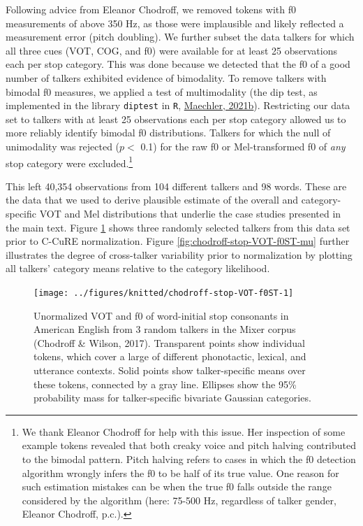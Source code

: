 \documentclass[
  11pt,
  man,floatsintext]{apa6}
\begin{document}
Following advice from Eleanor Chodroff, we removed tokens with f0 measurements of above 350 Hz, as those were implausible and likely reflected a measurement error (pitch doubling). We further subset the data talkers for which all three cues (VOT, COG, and f0) were available for at least 25 observations each per stop category. This was done because we detected that the f0 of a good number of talkers exhibited evidence of bimodality. To remove talkers with bimodal f0 measures, we applied a test of multimodality (the dip test, as implemented in the library \texttt{diptest} in \texttt{R}, \protect\hyperlink{ref-maechler2021}{Maechler, 2021b}). Restricting our data set to talkers with at least 25 observations each per stop category allowed us to more reliably identify bimodal f0 distributions. Talkers for which the null of unimodality was rejected (\(p<\) 0.1) for the raw f0 or Mel-transformed f0 of \emph{any} stop category were excluded.\footnote{We thank Eleanor Chodroff for help with this issue. Her inspection of some example tokens revealed that both creaky voice and pitch halving contributed to the bimodal pattern. Pitch halving refers to cases in which the f0 detection algorithm wrongly infers the f0 to be half of its true value. One reason for such estimation mistakes can be when the true f0 falls outside the range considered by the algorithm (here: 75-500 Hz, regardless of talker gender, Eleanor Chodroff, p.c.).}

This left 40,354 observations from 104 different talkers and 98 words. These are the data that we used to derive plausible estimate of the overall and category-specific VOT and Mel distributions that underlie the case studies presented in the main text. Figure \ref{fig:chodroff-stop-VOT-f0ST} shows three randomly selected talkers from this data set prior to C-CuRE normalization. Figure \ref{fig:chodroff-stop-VOT-f0ST-mu} further illustrates the degree of cross-talker variability prior to normalization by plotting all talkers' category means relative to the category likelihood.



\begin{figure}

{\centering \texttt{[image: ../figures/knitted/chodroff-stop-VOT-f0ST-1]} 

}

\caption{Unormalized VOT and f0 of word-initial stop consonants in American English from 3 random talkers in the Mixer corpus (Chodroff \& Wilson, 2017). Transparent points show individual tokens, which cover a large of different phonotactic, lexical, and utterance contexts. Solid points show talker-specific means over these tokens, connected by a gray line. Ellipses show the 95\% probability mass for talker-specific bivariate Gaussian categories.}\label{fig:chodroff-stop-VOT-f0ST}
\end{figure}
\end{document}
